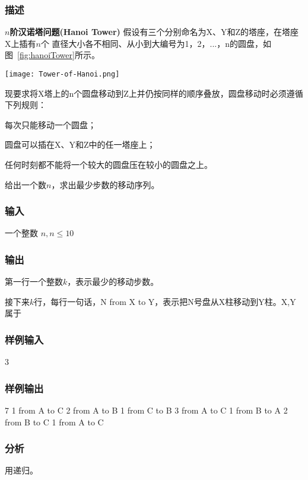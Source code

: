\subsubsection{描述}
\textbf{$n$阶汉诺塔问题(Hanoi Tower)} 假设有三个分别命名为X、Y和Z的塔座，在塔座X上插有$n$个
直径大小各不相同、从小到大编号为1，2，...，n的圆盘，如图~\ref{fig:hanoiTower}所示。

\begin{center}
\texttt{[image: Tower-of-Hanoi.png]}\\
\label{fig:hanoiTower}
\end{center}


现要求将X塔上的n个圆盘移动到Z上并仍按同样的顺序叠放，圆盘移动时必须遵循下列规则：
\begindot
\item 每次只能移动一个圆盘；
\item 圆盘可以插在X、Y和Z中的任一塔座上；
\item 任何时刻都不能将一个较大的圆盘压在较小的圆盘之上。
\myenddot
 
给出一个数$n$，求出最少步数的移动序列。


\subsubsection{输入}
一个整数 $n, n \leq 10$


\subsubsection{输出}
第一行一个整数$k$，表示最少的移动步数。

接下来$k$行，每行一句话，N from X to Y，表示把N号盘从X柱移动到Y柱。X,Y 属于


\subsubsection{样例输入}
\begin{Code}
3
\end{Code}


\subsubsection{样例输出}
\begin{Code}
7
1 from A to C
2 from A to B
1 from C to B
3 from A to C
1 from B to A
2 from B to C
1 from A to C
\end{Code}

\subsubsection{分析}
用递归。


